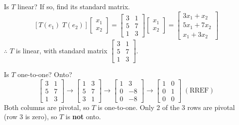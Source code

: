 \documentclass{article}
\begin{document}
\medskip

Is $T$ linear? If so, find its standard matrix.
\[
[T(e_1) \; T(e_2)] \begin{bmatrix} x_1 \\ x_2 \end{bmatrix} = \begin{bmatrix} 3 & 1 \\ 5 & 7 \\ 1 & 3 \end{bmatrix} \begin{bmatrix} x_1 \\ x_2 \end{bmatrix} = \begin{bmatrix} 3x_1+x_2 \\ 5x_1+7x_2 \\ x_1+3x_2 \end{bmatrix}
\]
$\therefore$ $T$ is linear, with standard matrix $\begin{bmatrix} 3 & 1 \\ 5 & 7 \\ 1 & 3 \end{bmatrix}$.

\medskip

Is $T$ one-to-one? Onto?
\[
\begin{bmatrix} 3 & 1 \\ 5 & 7 \\ 1 & 3 \end{bmatrix} \to \begin{bmatrix} 1 & 3 \\ 5 & 7 \\ 3 & 1 \end{bmatrix} \to \begin{bmatrix} 1 & 3 \\ 0 & -8 \\ 0 & -8 \end{bmatrix} \to \begin{bmatrix} 1 & 0 \\ 0 & 1 \\ 0 & 0 \end{bmatrix} \; (\text{RREF})
\]
Both columns are pivotal, so $T$ is one-to-one. Only 2 of the 3 rows are pivotal (row 3 is zero), so $T$ is \textbf{not} onto.
\end{document}
